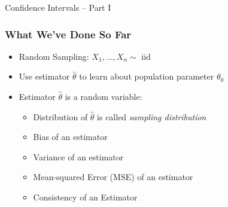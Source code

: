 \documentclass[handout]{beamer}
\date{Lecture 15}
\begin{document}
 





\begin{frame}[plain]
	\titlepage 
	

\end{frame} 




\begin{frame}

\centering \Huge Confidence Intervals -- Part I

\end{frame}

\begin{frame}
\frametitle{What We've Done So Far}

\begin{itemize}
\item Random Sampling: $X_1, \hdots, X_n \sim \mbox{ iid}$ 
\item Use estimator $\widehat{\theta}$ to learn about population parameter $\theta_0$ 
\item Estimator $\widehat{\theta}$ is a random variable: 
	\begin{itemize}
		\item Distribution of $\widehat{\theta}$ is called \emph{sampling distribution}
		\item Bias of an estimator 
		\item Variance of an estimator 
		\item Mean-squared Error (MSE) of an estimator 
		\item Consistency of an Estimator
	\end{itemize}
\end{itemize}


\end{frame}
\end{document}
